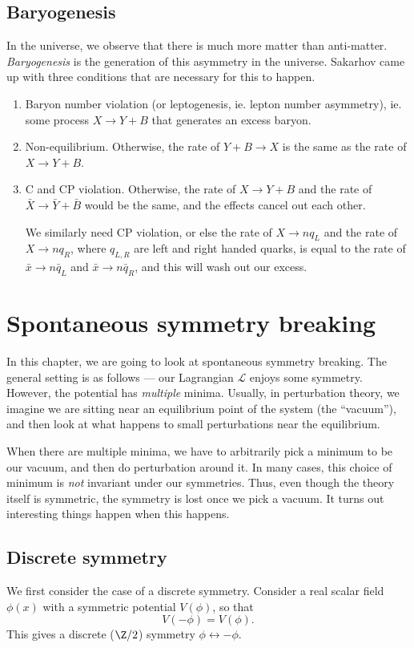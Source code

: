 \documentclass[a4paper]{article}
\begin{document}
\subsection{Baryogenesis}
In the universe, we observe that there is much more matter than anti-matter. \emph{Baryogenesis} is the generation of this asymmetry in the universe. Sakarhov came up with three conditions that are necessary for this to happen.
\begin{enumerate}
  \item Baryon number violation (or leptogenesis, ie. lepton number asymmetry), ie. some process $X \to Y + B$ that generates an excess baryon.
  \item Non-equilibrium. Otherwise, the rate of $Y + B \to X$ is the same as the rate of $X \to Y + B$.
  \item C and CP violation. Otherwise, the rate of $X \to Y + B$ and the rate of $\bar{X} \to \bar{Y} + \bar{B}$ would be the same, and the effects cancel out each other.

    We similarly need CP violation, or else the rate of $X \to nq_L$ and the rate of $X \to n q_R$, where $q_{L, R}$ are left and right handed quarks, is equal to the rate of $\bar{x} \to n \bar{q}_L$ and $\bar{x} \to n\bar{q}_R$, and this will wash out our excess.
\end{enumerate}

\section{Spontaneous symmetry breaking}
In this chapter, we are going to look at spontaneous symmetry breaking. The general setting is as follows --- our Lagrangian $\mathcal{L}$ enjoys some symmetry. However, the potential has \emph{multiple} minima. Usually, in perturbation theory, we imagine we are sitting near an equilibrium point of the system (the ``vacuum''), and then look at what happens to small perturbations near the equilibrium.

When there are multiple minima, we have to arbitrarily pick a minimum to be our vacuum, and then do perturbation around it. In many cases, this choice of minimum is \emph{not} invariant under our symmetries. Thus, even though the theory itself is symmetric, the symmetry is lost once we pick a vacuum. It turns out interesting things happen when this happens.

\subsection{Discrete symmetry}
We first consider the case of a discrete symmetry. Consider a real scalar field $\phi(x)$ with a symmetric potential $V(\phi)$, so that
\[
  V(-\phi) = V(\phi).
\]
This gives a discrete ($\Z/2$) symmetry $\phi \leftrightarrow -\phi$.
\end{document}

